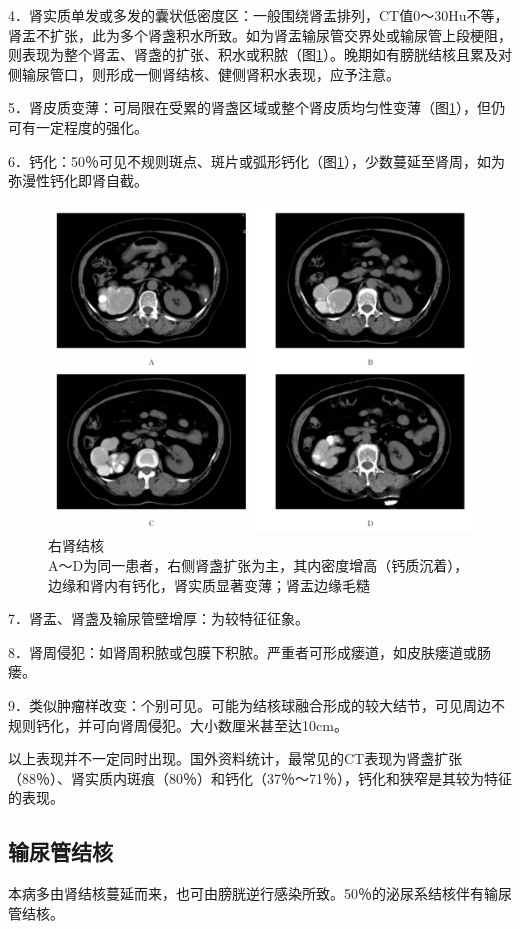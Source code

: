 4．肾实质单发或多发的囊状低密度区：一般围绕肾盂排列，CT值0～30Hu不等，肾盂不扩张，此为多个肾盏积水所致。如为肾盂输尿管交界处或输尿管上段梗阻，则表现为整个肾盂、肾盏的扩张、积水或积脓（图\ref{fig15-12}）。晚期如有膀胱结核且累及对侧输尿管口，则形成一侧肾结核、健侧肾积水表现，应予注意。

5．肾皮质变薄：可局限在受累的肾盏区域或整个肾皮质均匀性变薄（图\ref{fig15-12}），但仍可有一定程度的强化。

6．钙化：50％可见不规则斑点、斑片或弧形钙化（图\ref{fig15-12}），少数蔓延至肾周，如为弥漫性钙化即肾自截。

\begin{figure}[!htbp]
 \centering
 \includegraphics[width=.7\textwidth,height=\textheight,keepaspectratio]{./images/Image00327.jpg}
 \captionsetup{justification=centering}
 \caption{右肾结核\\{\small A～D为同一患者，右侧肾盏扩张为主，其内密度增高（钙质沉着），边缘和肾内有钙化，肾实质显著变薄；肾盂边缘毛糙}}
 \label{fig15-12}
  \end{figure} 

7．肾盂、肾盏及输尿管壁增厚：为较特征征象。

8．肾周侵犯：如肾周积脓或包膜下积脓。严重者可形成瘘道，如皮肤瘘道或肠瘘。

9．类似肿瘤样改变：个别可见。可能为结核球融合形成的较大结节，可见周边不规则钙化，并可向肾周侵犯。大小数厘米甚至达10cm。

以上表现并不一定同时出现。国外资料统计，最常见的CT表现为肾盏扩张（88％）、肾实质内斑痕（80％）和钙化（37％～71％），钙化和狭窄是其较为特征的表现。

\subsection{输尿管结核}

本病多由肾结核蔓延而来，也可由膀胱逆行感染所致。50％的泌尿系结核伴有输尿管结核。

